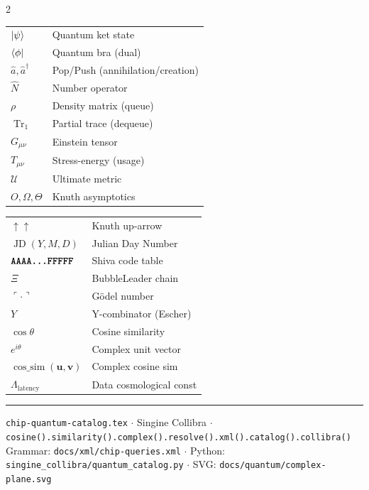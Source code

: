\documentclass[12pt,a4paper]{article}
\DeclareMathOperator{\cossim}{cos\_sim}
\DeclareMathOperator{\JD}{JD}
\newcommand{\gonum}[1]{\ulcorner #1 \urcorner}
\newcommand{\Ctable}[1]{\texttt{\textbf{#1}}}
\begin{document}
\begin{multicols}{2}
\begin{tabular}{@{}ll@{}}
$\ket{\psi}$           & Quantum ket state \\
$\bra{\phi}$           & Quantum bra (dual) \\
$\hat{a},\hat{a}^\dagger$ & Pop/Push (annihilation/creation) \\
$\hat{N}$              & Number operator \\
$\rho$                 & Density matrix (queue) \\
$\operatorname{Tr}_1$  & Partial trace (dequeue) \\
$G_{\mu\nu}$           & Einstein tensor \\
$T_{\mu\nu}$           & Stress-energy (usage) \\
$\mathcal{U}$          & Ultimate metric \\
$O, \Omega, \Theta$    & Knuth asymptotics \\
\end{tabular}
\columnbreak
\begin{tabular}{@{}ll@{}}
$\uparrow\uparrow$     & Knuth up-arrow \\
$\JD(Y,M,D)$           & Julian Day Number \\
$\Ctable{AAAA\ldots FFFFF}$ & Shiva code table \\
$\Xi$                  & BubbleLeader chain \\
$\gonum{\cdot}$        & Gödel number \\
$Y$                    & Y-combinator (Escher) \\
$\cos\theta$           & Cosine similarity \\
$e^{i\theta}$          & Complex unit vector \\
$\cossim(\mathbf{u},\mathbf{v})$ & Complex cosine sim \\
$\Lambda_{\text{latency}}$ & Data cosmological const \\
\end{tabular}
\end{multicols}

\bigskip\hrule\bigskip
\noindent
\small\textcolor{godelGray}{%
  \texttt{chip-quantum-catalog.tex} $\cdot$
  Singine Collibra $\cdot$
  \texttt{cosine().similarity().complex().resolve().xml().catalog().collibra()}\\
  Grammar: \texttt{docs/xml/chip-queries.xml} $\cdot$
  Python: \texttt{singine\_collibra/quantum\_catalog.py} $\cdot$
  SVG: \texttt{docs/quantum/complex-plane.svg}
}
\end{document}
